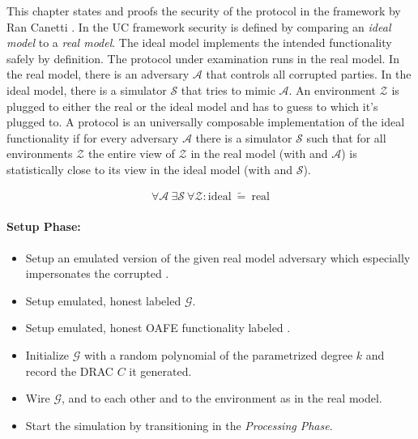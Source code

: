 \label{sec:security}

This chapter states and proofs the security of the protocol in the
 framework by Ran Canetti \cite{canetti05}.
In the UC framework security is defined by comparing an \emph{ideal model} to a
\emph{real model}. The ideal model implements the intended functionality
\JWfuncSym{}{} safely by definition. The protocol under examination runs in the
real model. In the real model, there is an adversary $\mathcal{A}$ that controls
all corrupted parties.  In the ideal model, there is a simulator $\mathcal{S}$
that tries to mimic $\mathcal{A}$. An environment $\mathcal{Z}$ is plugged to
either the real or the ideal model and has to guess to which it's plugged to. A
protocol \JWprotoSym{}{} is an universally composable implementation of the
ideal functionality if for every adversary $\mathcal{A}$ there is a
simulator $\mathcal{S}$ such that for all environments $\mathcal{Z}$ the entire
view of $\mathcal{Z}$ in the real model (with \JWprotoSym{}{} and $\mathcal{A}$)
is statistically close to its view in the ideal model (with \JWfuncSym{}{} and
$\mathcal{S}$).

\begin{align*}
%
\forall \mathcal{A}\ \exists \mathcal{S}\ \forall \mathcal{Z} :
\text{ideal}\ \widetilde{=}\ \text{real}
%
\end{align*}

%
%
\label{sec:simulators}


\label{sec:simulator-david}

\paragraph{Setup Phase:}

\begin{itemize}

  \item Setup an emulated version of the given real model adversary
    \JWadv{} which especially impersonates the corrupted \JWpTwo{}.

  \item Setup emulated, honest \JWpOne{} labeled $\mathcal{G}$.

  \item Setup emulated, honest OAFE functionality labeled \JWfuncSymOAFE{}.

  \item Initialize $\mathcal{G}$ with a random polynomial of the parametrized
    degree $k$ and record the DRAC $C$ it generated.

  \item Wire $\mathcal{G}$, \JWfuncSymOAFE{} and \JWadv{} to each other
    and \JWadv{} to the environment as in the real model.

  \item Start the simulation by transitioning in the \emph{Processing Phase}.

\end{itemize}

